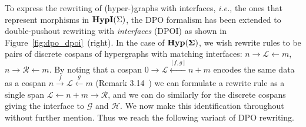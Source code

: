To express the rewriting of (hyper-)graphs with interfaces,  \textit{i.e.},  the ones that represent morphisms in $\textbf{HypI}(\Sigma)$, the DPO formalism has been extended to double-pushout rewriting with \textit{interfaces}  (DPOI) as shown in Figure~\ref{fig:dpo_dpoi}~(right).
In the case of $ \mathbf{Hyp(\Sigma)}$,  we wish rewrite rules to be pairs of discrete cospans of hypergraphs with matching interfaces: $n \xrightarrow{} \mathcal L \xleftarrow{} m$, $n \xrightarrow{} \mathcal R \xleftarrow{} m$.  
By noting that a cospan $0 \xrightarrow{} \mathcal L \xleftarrow{[f,g]} n + m$ encodes the same data as a cospan $n \xrightarrow{f} \mathcal L \xleftarrow{g} m$ (Remark 3.14~\cite{bonchi_string_2022-1}) we can formulate a rewrite rule as a single span $\mathcal L \xleftarrow{} n+m \xrightarrow{} \mathcal R$,  and we can do similarly for the discrete cospans giving the interface to $\mathcal G$ and $\mathcal H$.  
We now make this identification throughout without further mention.  
Thus we reach the following variant of DPO rewriting.
